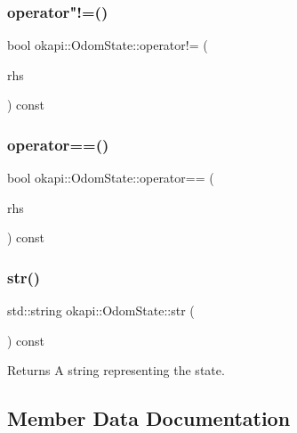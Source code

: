 \subsubsection{\texorpdfstring{operator"!=()}{operator!=()}}
{\footnotesize\ttfamily bool okapi\+::\+Odom\+State\+::operator!= (\begin{DoxyParamCaption}\item[{const \mbox{\hyperlink{structokapi_1_1OdomState}{Odom\+State}} \&}]{rhs }\end{DoxyParamCaption}) const}

\mbox{\label{structokapi_1_1OdomState_a17668afbbe39bcc745233a679aa917de}} 
\subsubsection{\texorpdfstring{operator==()}{operator==()}}
{\footnotesize\ttfamily bool okapi\+::\+Odom\+State\+::operator== (\begin{DoxyParamCaption}\item[{const \mbox{\hyperlink{structokapi_1_1OdomState}{Odom\+State}} \&}]{rhs }\end{DoxyParamCaption}) const}

\mbox{\label{structokapi_1_1OdomState_adfaa3faf1931a8027af8a3cf9de439c1}} 
\subsubsection{\texorpdfstring{str()}{str()}}
{\footnotesize\ttfamily std\+::string okapi\+::\+Odom\+State\+::str (\begin{DoxyParamCaption}{ }\end{DoxyParamCaption}) const}

\begin{DoxyReturn}{Returns}
A string representing the state. 
\end{DoxyReturn}


\subsection{Member Data Documentation}
\mbox{\label{structokapi_1_1OdomState_a7d9c4f949e7ce0dd000c08318e61b921}} 
